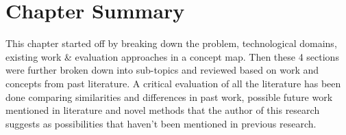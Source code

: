 


\section{Chapter Summary}
This chapter started off by breaking down the problem, technological domains, existing work \& evaluation approaches in a concept map. Then these 4 sections were further broken down into sub-topics and reviewed based on work and concepts from past literature. A critical evaluation of all the literature has been done comparing similarities and differences in past work, possible future work mentioned in literature and novel methods that the author of this research suggests as possibilities that haven't been mentioned in previous research.